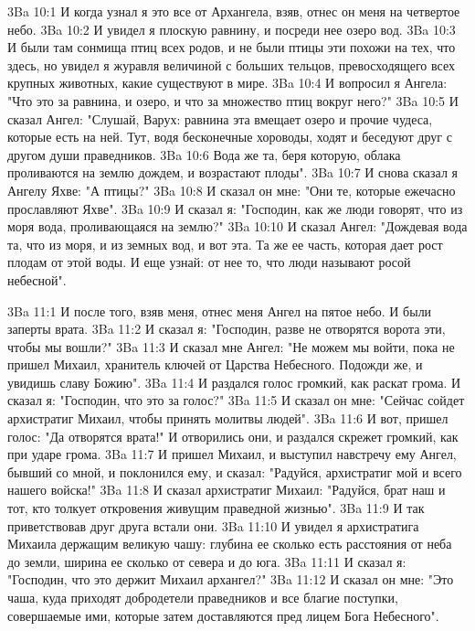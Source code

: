 \vs 3Ba 10:1
И когда узнал я это все от Архангела, взяв, отнес он меня на четвертое небо.
\vs 3Ba 10:2
И увидел я плоскую равнину, и посреди нее озеро вод.
\vs 3Ba 10:3
И были там сонмища птиц всех родов, и не были птицы эти похожи на тех, что здесь, но увидел я журавля величиной с больших тельцов, превосходящего всех крупных животных, какие существуют в мире.
\vs 3Ba 10:4
И вопросил я Ангела: "Что это за равнина, и озеро, и что за множество птиц вокруг него?"
\vs 3Ba 10:5
И сказал Ангел: "Слушай, Варух: равнина эта вмещает озеро и прочие чудеса, которые есть на ней. Тут, водя бесконечные хороводы, ходят и беседуют друг с другом души праведников.
\vs 3Ba 10:6
Вода же та, беря которую, облака проливаются на землю дождем, и возрастают плоды".
\vs 3Ba 10:7
И снова сказал я Ангелу Яхве: "А птицы?"
\vs 3Ba 10:8
И сказал он мне: "Они те, которые ежечасно прославляют Яхве".
\vs 3Ba 10:9
И сказал я: "Господин, как же люди говорят, что из моря вода, проливающаяся на землю?"
\vs 3Ba 10:10
И сказал Ангел: "Дождевая вода та, что из моря, и из земных вод, и вот эта. Та же ее часть, которая дает рост плодам от этой воды. И еще узнай: от нее то, что люди называют росой небесной".

\vs 3Ba 11:1
И после того, взяв меня, отнес меня Ангел на пятое небо. И были заперты врата.
\vs 3Ba 11:2
И сказал я: "Господин, разве не отворятся ворота эти, чтобы мы вошли?"
\vs 3Ba 11:3
И сказал мне Ангел: "Не можем мы войти, пока не пришел Михаил, хранитель ключей от Царства Небесного. Подожди же, и увидишь славу Божию".
\vs 3Ba 11:4
И раздался голос громкий, как раскат грома. И сказал я: "Господин, что это за голос?"
\vs 3Ba 11:5
И сказал он мне: "Сейчас сойдет архистратиг Михаил, чтобы принять молитвы людей".
\vs 3Ba 11:6
И вот, пришел голос: "Да отворятся врата!" И отворились они, и раздался скрежет громкий, как при ударе грома.
\vs 3Ba 11:7
И пришел Михаил, и выступил навстречу ему Ангел, бывший со мной, и поклонился ему, и сказал: "Радуйся, архистратиг мой и всего нашего войска!"
\vs 3Ba 11:8
И сказал архистратиг Михаил: "Радуйся, брат наш и тот, кто толкует откровения живущим праведной жизнью".
\vs 3Ba 11:9
И так приветствовав друг друга встали они.
\vs 3Ba 11:10
И увидел я архистратига Михаила держащим великую чашу: глубина ее сколько есть расстояния от неба до земли, ширина ее сколько от севера и до юга.
\vs 3Ba 11:11
И сказал я: "Господин, что это держит Михаил архангел?"
\vs 3Ba 11:12
И сказал он мне: "Это чаша, куда приходят добродетели праведников и все благие поступки, совершаемые ими, которые затем доставляются пред лицем Бога Небесного".


